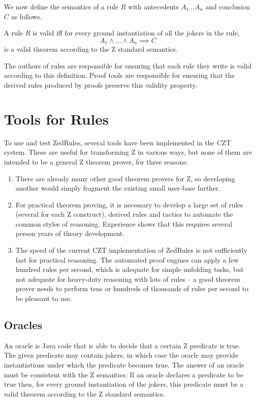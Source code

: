 \documentclass{entcs}
\begin{document}
We now define the semantics of a rule $R$ with antecedents $A_1
\ldots A_n$ and conclusion $C$ as follows.
\begin{defn} %
  A rule $R$ is valid iff for every ground instantiation of
  all the jokers in the rule,
  \[
       A_1 \land \ldots \land A_n \implies C
  \]
  is a valid theorem according to the Z standard semantics.
\end{defn}

The authors of rules are responsible for ensuring that each rule they
write is valid according to this definition.  Proof tools are
responsible for ensuring that the derived rules produced by proofs
preserve this validity property.


\section{Tools for Rules} \label{sec:tools}

To use and test ZedRules, several tools have been implemented in the
CZT system.  These are useful for transforming Z in various ways, but
none of them are intended to be a general Z theorem prover, for three
reasons:
\begin{enumerate}
\item There are already many other good theorem provers for Z, so
  developing another would simply fragment the existing small
  user-base further.
\item For practical theorem proving, it is necessary to develop a large set
  of rules (several for each Z construct), derived rules and tactics to
  automate the common styles of reasoning.  Experience shows that this
  requires several person years of theory development. 
\item The speed of the current CZT implementation of ZedRules is not
  sufficiently fast for practical reasoning.  The automated proof engines can
  apply a few hundred rules per second, which is adequate for simple unfolding
  tasks, but not adequate for heavy-duty reasoning with lots of rules --
  a good theorem prover needs to perform tens or hundreds of thousands of
  rules per second to be pleasant to use.
\end{enumerate}


\subsection{Oracles}

An oracle is Java code that is able to decide that a certain Z
predicate is true.  The given predicate may contain jokers, in which
case the oracle may provide instantiations under which the predicate
becomes true.  The answer of an oracle must be consistent with the Z
semantics: If an oracle declares a predicate to be true then, for
every ground instantiation of the jokers, this predicate must be a
valid theorem according to the Z standard semantics.
\end{document}
